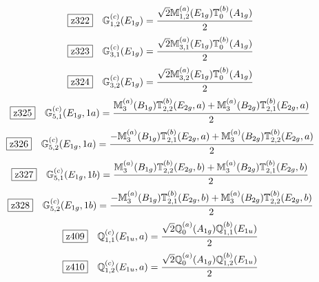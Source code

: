 \documentclass[fleqn,10pt,landscape]{jsarticle}
\begin{document}
\begin{dmath*}
\hspace*{3mm}\fbox{z322}\quad \mathbb{G}_{1,2}^{(c)}(E_{1g})=\frac{\sqrt{2} \mathbb{M}_{1,2}^{(a)}(E_{1g}) \mathbb{T}_{0}^{(b)}(A_{1g})}{2}
\end{dmath*}
\begin{dmath*}
\hspace*{3mm}\fbox{z323}\quad \mathbb{G}_{3,1}^{(c)}(E_{1g})=\frac{\sqrt{2} \mathbb{M}_{3,1}^{(a)}(E_{1g}) \mathbb{T}_{0}^{(b)}(A_{1g})}{2}
\end{dmath*}
\begin{dmath*}
\hspace*{3mm}\fbox{z324}\quad \mathbb{G}_{3,2}^{(c)}(E_{1g})=\frac{\sqrt{2} \mathbb{M}_{3,2}^{(a)}(E_{1g}) \mathbb{T}_{0}^{(b)}(A_{1g})}{2}
\end{dmath*}
\begin{dmath*}
\hspace*{3mm}\fbox{z325}\quad \mathbb{G}_{5,1}^{(c)}(E_{1g},1a)=\frac{\mathbb{M}_{3}^{(a)}(B_{1g}) \mathbb{T}_{2,2}^{(b)}(E_{2g},a) + \mathbb{M}_{3}^{(a)}(B_{2g}) \mathbb{T}_{2,1}^{(b)}(E_{2g},a)}{2}
\end{dmath*}
\begin{dmath*}
\hspace*{3mm}\fbox{z326}\quad \mathbb{G}_{5,2}^{(c)}(E_{1g},1a)=\frac{- \mathbb{M}_{3}^{(a)}(B_{1g}) \mathbb{T}_{2,1}^{(b)}(E_{2g},a) + \mathbb{M}_{3}^{(a)}(B_{2g}) \mathbb{T}_{2,2}^{(b)}(E_{2g},a)}{2}
\end{dmath*}
\begin{dmath*}
\hspace*{3mm}\fbox{z327}\quad \mathbb{G}_{5,1}^{(c)}(E_{1g},1b)=\frac{\mathbb{M}_{3}^{(a)}(B_{1g}) \mathbb{T}_{2,2}^{(b)}(E_{2g},b) + \mathbb{M}_{3}^{(a)}(B_{2g}) \mathbb{T}_{2,1}^{(b)}(E_{2g},b)}{2}
\end{dmath*}
\begin{dmath*}
\hspace*{3mm}\fbox{z328}\quad \mathbb{G}_{5,2}^{(c)}(E_{1g},1b)=\frac{- \mathbb{M}_{3}^{(a)}(B_{1g}) \mathbb{T}_{2,1}^{(b)}(E_{2g},b) + \mathbb{M}_{3}^{(a)}(B_{2g}) \mathbb{T}_{2,2}^{(b)}(E_{2g},b)}{2}
\end{dmath*}
\begin{dmath*}
\hspace*{3mm}\fbox{z409}\quad \mathbb{Q}_{1,1}^{(c)}(E_{1u},a)=\frac{\sqrt{2} \mathbb{Q}_{0}^{(a)}(A_{1g}) \mathbb{Q}_{1,1}^{(b)}(E_{1u})}{2}
\end{dmath*}
\begin{dmath*}
\hspace*{3mm}\fbox{z410}\quad \mathbb{Q}_{1,2}^{(c)}(E_{1u},a)=\frac{\sqrt{2} \mathbb{Q}_{0}^{(a)}(A_{1g}) \mathbb{Q}_{1,2}^{(b)}(E_{1u})}{2}
\end{dmath*}
\end{document}

